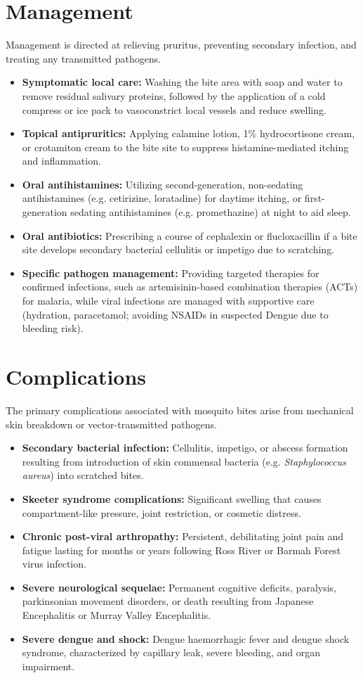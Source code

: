 \section*{Management}
Management is directed at relieving pruritus, preventing secondary infection, and treating any transmitted pathogens.
\begin{itemize}
    \item \textbf{Symptomatic local care:} Washing the bite area with soap and water to remove residual salivary proteins, followed by the application of a cold compress or ice pack to vasoconstrict local vessels and reduce swelling.
    \item \textbf{Topical antipruritics:} Applying calamine lotion, 1\% hydrocortisone cream, or crotamiton cream to the bite site to suppress histamine-mediated itching and inflammation.
    \item \textbf{Oral antihistamines:} Utilizing second-generation, non-sedating antihistamines (e.g. cetirizine, loratadine) for daytime itching, or first-generation sedating antihistamines (e.g. promethazine) at night to aid sleep.
    \item \textbf{Oral antibiotics:} Prescribing a course of cephalexin or flucloxacillin if a bite site develops secondary bacterial cellulitis or impetigo due to scratching.
    \item \textbf{Specific pathogen management:} Providing targeted therapies for confirmed infections, such as artemisinin-based combination therapies (ACTs) for malaria, while viral infections are managed with supportive care (hydration, paracetamol; avoiding NSAIDs in suspected Dengue due to bleeding risk).
\end{itemize}

\section*{Complications}
The primary complications associated with mosquito bites arise from mechanical skin breakdown or vector-transmitted pathogens.
\begin{itemize}
    \item \textbf{Secondary bacterial infection:} Cellulitis, impetigo, or abscess formation resulting from introduction of skin commensal bacteria (e.g. \textit{Staphylococcus aureus}) into scratched bites.
    \item \textbf{Skeeter syndrome complications:} Significant swelling that causes compartment-like pressure, joint restriction, or cosmetic distress.
    \item \textbf{Chronic post-viral arthropathy:} Persistent, debilitating joint pain and fatigue lasting for months or years following Ross River or Barmah Forest virus infection.
    \item \textbf{Severe neurological sequelae:} Permanent cognitive deficits, paralysis, parkinsonian movement disorders, or death resulting from Japanese Encephalitis or Murray Valley Encephalitis.
    \item \textbf{Severe dengue and shock:} Dengue haemorrhagic fever and dengue shock syndrome, characterized by capillary leak, severe bleeding, and organ impairment.
\end{itemize}

